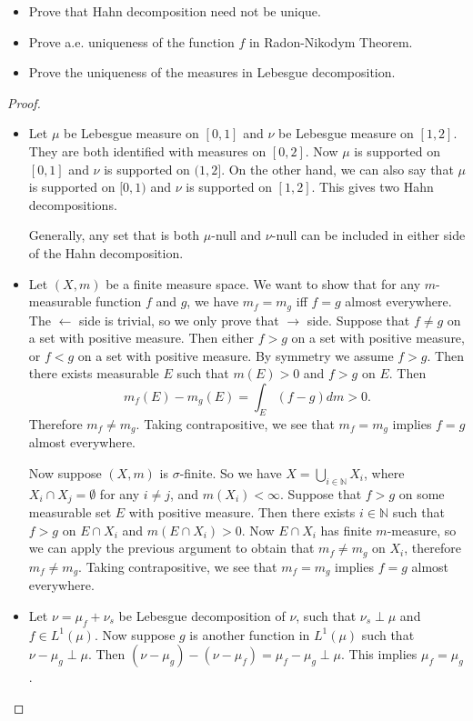 \begin{problem}
	\begin{itemize}
		\item Prove that Hahn decomposition need not be unique.
		\item Prove a.e. uniqueness of the function $f$ in Radon-Nikodym Theorem.
		\item Prove the uniqueness of the measures in Lebesgue decomposition.
	\end{itemize}
\end{problem}
\begin{proof}
	\begin{itemize}
		\item Let $\mu$ be Lebesgue measure on $[0,1]$ and $\nu$ be Lebesgue measure on $[1,2]$. They are both identified with measures on $[0,2]$. Now $\mu$ is supported on $[0,1]$ and $\nu$ is supported on $(1,2]$. On the other hand, we can also say that $\mu$ is supported on $[0,1)$ and $\nu$ is supported on $[1,2]$. This gives two Hahn decompositions.

		Generally, any set that is both $\mu$-null and $\nu$-null can be included in either side of the Hahn decomposition.

	\item 
		Let $(X, m)$ be a finite measure space. We want to show that for any $m$-measurable function $f$ and $g$, we have $m_f = m_g$ iff $f = g$ almost everywhere. The $\gets $ side is trivial, so we only prove that $\to $ side. Suppose that $f \neq g$ on a set with positive measure. Then either $f > g$ on a set with positive measure, or $f < g$ on a set with positive measure. By symmetry we assume $f > g$. Then there exists measurable  $E$ such that $m(E) > 0 $ and $f > g $ on $E$. Then
		\[
			m_f(E) - m_g(E) = \int _E (f-g) dm > 0 
		.\] 
		Therefore $m_f \neq m_g$. Taking contrapositive, we see that $m_f = m_g$ implies $f = g$ almost everywhere.

		Now suppose $(X,m)$ is $\sigma$-finite. So we have $X = \bigcup_{i \in \mathbb{N}} X_i$, where $X_i \cap X_j = \emptyset $ for any $i \neq j$, and $m(X_i) < \infty $.  Suppose that $f > g$ on some measurable set $E$ with positive measure. Then there exists $i \in \mathbb{N}$ such that $f>g$ on $E \cap X_i$ and $m(E \cap X_i) > 0$. Now $E \cap X_i$ has finite $m$-measure, so we can apply the previous argument to obtain that $m_f \neq  m_g$ on $X_i$, therefore $m_f \neq  m_g$. Taking contrapositive, we see that $m_f = m_g$ implies $f = g$ almost everywhere.

		\item
			Let $\nu = \mu_f + \nu_{s}$ be Lebesgue decomposition of $\nu$, such that $\nu_s \perp \mu$ and $f \in L^1(\mu)$. Now suppose $g$ is another function in $L^1(\mu)$ such that $\nu - \mu_g \perp \mu$. Then $(\nu - \mu_g) - (\nu - \mu_f) = \mu_f - \mu_g\perp \mu$. This implies $\mu_f = \mu_g$.
\end{itemize}
\end{proof}

